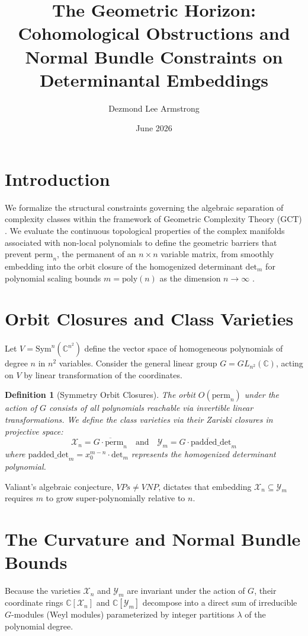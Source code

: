 \documentclass{article}
\title{The Geometric Horizon: Cohomological Obstructions and Normal Bundle Constraints on Determinantal Embeddings}
\author{Dezmond Lee Armstrong}
\date{June 2026}
\newtheorem{definition}{Definition}
\begin{document}
\maketitle

\section{Introduction}
We formalize the structural constraints governing the algebraic separation of complexity classes within the framework of Geometric Complexity Theory (GCT) \cite{Mulmuley2002GeometricCT}. We evaluate the continuous topological properties of the complex manifolds associated with non-local polynomials to define the geometric barriers that prevent $\text{perm}_n$, the permanent of an $n \times n$ variable matrix, from smoothly embedding into the orbit closure of the homogenized determinant $\text{det}_m$ for polynomial scaling bounds $m = \text{poly}(n)$ as the dimension $n \rightarrow \infty$ \cite{On P vs. NP, Geometric Complexity Theory, and the Riemann Hypothesis}.

\section{Orbit Closures and Class Varieties}
Let $V = \text{Sym}^n(\mathbb{C}^{n^2})$ define the vector space of homogeneous polynomials of degree $n$ in $n^2$ variables. Consider the general linear group $G = GL_{n^2}(\mathbb{C})$, acting on $V$ by linear transformation of the coordinates.

\begin{definition}[Symmetry Orbit Closures]
The orbit $O(\text{perm}_n)$ under the action of $G$ consists of all polynomials reachable via invertible linear transformations. We define the class varieties via their Zariski closures in projective space:
\begin{equation}
\mathcal{X}_n = \overline{G \cdot \text{perm}_n} \quad \text{and} \quad \mathcal{Y}_m = \overline{G \cdot \text{padded\_det}_m}
\end{equation}
where $\text{padded\_det}_m = x_0^{m-n} \cdot \text{det}_m$ represents the homogenized determinant polynomial.
\end{definition}

Valiant's algebraic conjecture, $VPs \neq VNP$, dictates that embedding $\mathcal{X}_n \subseteq \mathcal{Y}_m$ requires $m$ to grow super-polynomially relative to $n$.

\section{The Curvature and Normal Bundle Bounds}
Because the varieties $\mathcal{X}_n$ and $\mathcal{Y}_m$ are invariant under the action of $G$, their coordinate rings $\mathbb{C}[\mathcal{X}_n]$ and $\mathbb{C}[\mathcal{Y}_m]$ decompose into a direct sum of irreducible $G$-modules (Weyl modules) parameterized by integer partitions $\lambda$ of the polynomial degree.
\end{document}

